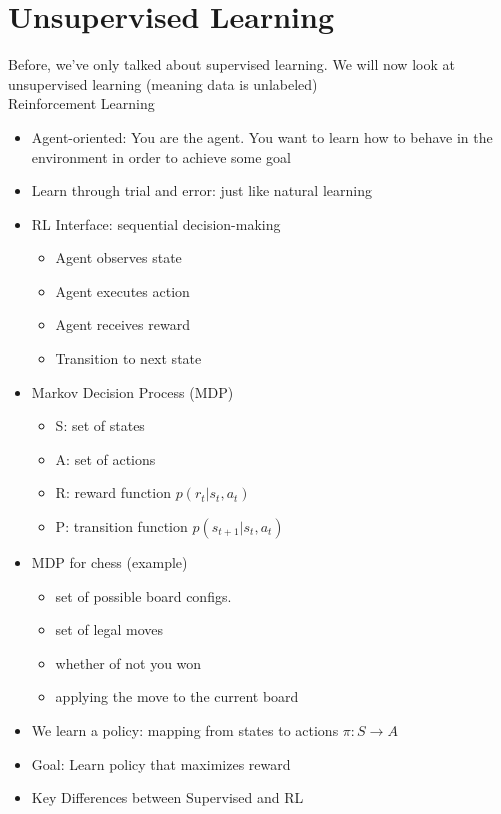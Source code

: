 \documentclass[10pt, oneside]{article}
\begin{document}
\section{Unsupervised Learning}
Before, we've only talked about supervised learning. We will now look at unsupervised learning (meaning data is unlabeled)
\vspace{0.15in}\\
Reinforcement Learning
\begin{itemize}
    \item Agent-oriented: You are the agent. You want to learn how to behave in the environment in order to achieve some goal
    \item Learn through trial and error: just like natural learning
    \item RL Interface: sequential decision-making
    \begin{itemize}
        \item Agent observes state
        \item Agent executes action
        \item Agent receives reward
        \item Transition to next state
    \end{itemize}
    \item Markov Decision Process (MDP)
    \begin{itemize}
        \item S: set of states
        \item A: set of actions
        \item R: reward function $p(r_t | s_t, a_t)$
        \item P: transition function $p(s_{t+1}|s_t, a_t)$
    \end{itemize}
    \item MDP for chess (example)
    \begin{itemize}
        \item set of possible board configs.
        \item set of legal moves
        \item whether of not you won
        \item applying the move to the current board
    \end{itemize}
    \item We learn a policy: mapping from states to actions $\pi: S\rightarrow A$
    \item Goal: Learn policy that maximizes reward
    \item Key Differences between Supervised and RL

\end{itemize}
\end{document}
